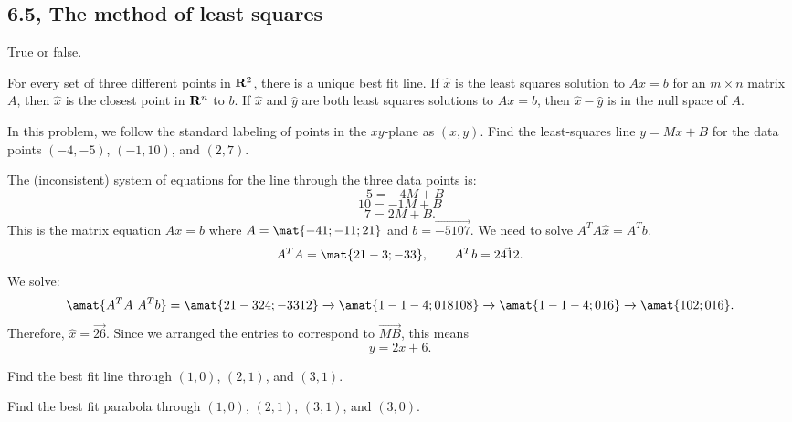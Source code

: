 \subsection{6.5, The method of least squares}
\begin{problems}
%  
\problem  %
True or false.
\begin{subproblems}
    \subproblem For every set of three different points in ${\bf R}^2$, there is a unique best fit line.
    \subproblem If $\hat{x}$ is the least squares solution to $Ax = b$ for an $m \times n$ matrix $A$, then $\hat{x}$ is the closest point in ${\bf R}^n$ to $b$.
    \subproblem If $\hat{x}$ and $\hat{y}$ are both least squares solutions to $Ax = b$, then $\hat{x} - \hat{y}$ is in the null space of $A$.
\end{subproblems}


\problem  %
%  
In this problem, we follow the standard labeling of points in the
$xy$-plane as $(x,y)$. \newline \newline Find the least-squares line
$y = Mx + B$ for the data points $(-4, -5)$, $(-1, 10)$, and $(2,
7)$.  %

\begin{solution}
  The (inconsistent) system of equations for the line through the
  three data points is:
  \[-5 = -4M + B\]
  \[10 = -1M + B\]
  \[7 = 2M + B.\]
  This is the matrix equation $Ax=b$ where
  $A = \mat{-4 1; -1 1; 2 1}$ and $b= \vec{-5 10 7}$.  \newline
  \newline We need to solve $A^TA\hat{x} = A^T b$.
  \[A^T A = \mat{21 -3; -3 3}, \qquad
    A^T b = \vec{24 12}.\]
  We solve:
  \[\amat{A^TA \ A^Tb} = \amat{21 -3 24; -3 3 12}
    \xrightarrow[]{} \amat{1 -1 -4; 0 18 108}
    \xrightarrow[]{} \amat{1 -1 -4; 0 1 6}
    \xrightarrow[]{} \amat{1 0 2; 0 1 6}.
    \]
  Therefore, $\hat{x} = \vec{2 6}$.  Since we arranged the
  entries to correspond to $\vec{M B}$, this means
    \[\boxed{y = 2x + 6}.\] 
\end{solution}

\problem  %
Find the best fit line through $(1, 0)$, $(2, 1)$, and $(3, 1)$. 

\problem  %
Find the best fit parabola through $(1, 0)$, $(2, 1)$, $(3, 1)$, and $(3, 0)$. 
\end{problems} \setcounter{problem}{0}

\newpage